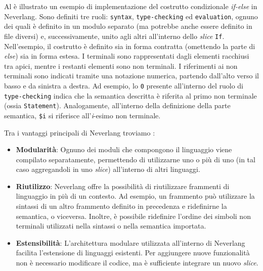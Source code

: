 \documentclass[12pt,a4paper,openright,twoside]{book}
\begin{document}


Al  è illustrato un esempio di implementazione del costrutto condizionale \textit{if-else} in Neverlang. Sono definiti 
tre ruoli: \texttt{syntax}, \texttt{type-checking} ed \texttt{evaluation}, ognuno dei quali è definito in un modulo separato (ma potrebbe anche 
essere definito in file diversi) e, successivamente, unito agli altri all’interno dello \textit{slice} \texttt{If}. Nell’esempio, il costrutto è 
definito sia in forma contratta (omettendo la parte di \textit{else}) sia in forma estesa. I terminali sono rappresentati dagli elementi racchiusi 
tra apici, mentre i restanti elementi sono non terminali. I riferimenti ai non terminali sono indicati tramite una notazione numerica, partendo 
dall’alto verso il basso e da sinistra a destra. Ad esempio, lo \texttt{0} presente all’interno del ruolo di \texttt{type-checking} indica che 
la semantica descritta è riferita al primo non terminale (ossia \texttt{Statement}). Analogamente, all’interno della definizione della parte 
semantica, \texttt{\$i} si riferisce all’\textit{i}-esimo non terminale.

Tra i vantaggi principali di Neverlang troviamo \cite{Cazzola2012}:
\begin{itemize}
    \item \textbf{Modularità}: Ognuno dei moduli che compongono il linguaggio viene compilato separatamente, permettendo di utilizzarne uno o 
    più di uno (in tal caso aggregandoli in uno \textit{slice}) all’interno di altri linguaggi.
    \item \textbf{Riutilizzo}: Neverlang offre la possibilità di riutilizzare frammenti di linguaggio in più di un contesto. Ad esempio, un 
    frammento può utilizzare la sintassi di un altro frammento definito in precedenza e ridefinirne la semantica, o viceversa. Inoltre, è 
    possibile ridefinire l’ordine dei simboli non terminali utilizzati nella sintassi o nella semantica importata.
    \item \textbf{Estensibilità}: L’architettura modulare utilizzata all’interno di Neverlang facilita l’estensione di linguaggi esistenti. 
    Per aggiungere nuove funzionalità non è necessario modificare il codice, ma è sufficiente integrare un nuovo \textit{slice}.
\end{itemize}
\end{document}
